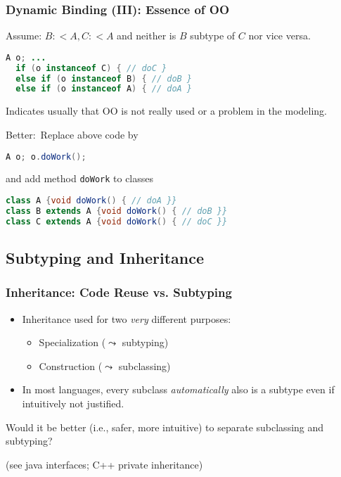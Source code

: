 \documentclass{beamer}
\newcommand{\Blue}[1]{\color{blue}#1\color{black}}
\begin{document}
\begin{frame}[fragile]
\frametitle{Dynamic Binding (III): Essence of OO}

Assume: $B:<A, C:<A$ and neither is $B$ subtype of $C$ nor vice versa.
\begin{lstlisting}[language=Java, basicstyle=\small\ttfamily]
  A o; ...
  if (o instanceof C) { // doC }
  else if (o instanceof B) { // doB }
  else if (o instanceof A) { // doA }
\end{lstlisting}

\pause

Indicates usually that OO is not really used or a problem in the
modeling.  

\medskip

\pause

\Blue{Better:}\ Replace above code by

\begin{lstlisting}[language=Java, basicstyle=\small\ttfamily]
  A o; o.doWork();
\end{lstlisting}

and add method \texttt{doWork} to classes

\begin{lstlisting}[language=Java, basicstyle=\small\ttfamily]
class A {void doWork() { // doA }}
class B extends A {void doWork() { // doB }}
class C extends A {void doWork() { // doC }}
\end{lstlisting}


\end{frame}

\subsection{Subtyping and Inheritance}



\begin{frame}[fragile]
\frametitle{Inheritance: Code Reuse vs. Subtyping}

\begin{itemize}
\item  Inheritance used for two \textit{very}
different purposes:
\begin{itemize}
\item Specialization ($\leadsto$ subtyping)
\item Construction   ($\leadsto$ subclassing)
\end{itemize}
\item In most languages, every subclass 
\textit{automatically} also is a  subtype even if
intuitively not justified. 
\end{itemize}


\bigskip

Would it be better (i.e., safer, more intuitive) 
to separate subclassing and subtyping? 

(see java interfaces; C++ private inheritance)

\end{frame}
\end{document}
